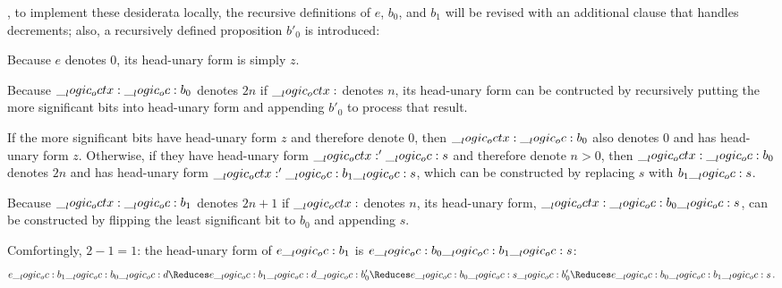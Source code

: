 , to implement these desiderata locally, the recursive definitions of $e$, $b_0$, and $b_1$ will be revised with an additional clause that handles decrements;
also, a recursively defined proposition $b'_0$ is introduced:
% 
\begin{description}[font=\color{structure}]
\item[$e \defd (\dotsb \pmir i) \with (z \pmir d)$]
  Because $e$ denotes $0$, its head-unary form is simply $z$.
\item[$b_0 \defd (\dotsb \pmir i) \with (d \fuse b'_0 \pmir d)$]
  Because $\__logic_octx: \__logic_oc: b_0$ denotes $2n$ if $\__logic_octx:$ denotes $n$, its head-unary form can be contructed by recursively putting the more significant bits into head-unary form and appending $b'_0$ to process that result.
\item[$b'_0 \defd (z \limp z) \with (s \limp b_1 \fuse s)$]
  If the more significant bits have head-unary form $z$ and therefore denote $0$, then $\__logic_octx: \__logic_oc: b_0$ also denotes $0$ and has head-unary form $z$.
  Otherwise, if they have head-unary form $\__logic_octx:' \__logic_oc: s$ and therefore denote $n > 0$, then $\__logic_octx: \__logic_oc: b_0$ denotes $2n$ and has head-unary form $\__logic_octx:' \__logic_oc: b_1 \__logic_oc: s$, which can be constructed by replacing $s$ with $b_1 \__logic_oc: s$.
\item[$b_1 \defd (\dotsb \pmir i) \with (b_0 \fuse s \pmir d)$]
  Because $\__logic_octx: \__logic_oc: b_1$ denotes $2n+1$ if $\__logic_octx:$ denotes $n$, its head-unary form, $\__logic_octx: \__logic_oc: b_0 \__logic_oc: s$, can be constructed by flipping the least significant bit to $b_0$ and appending $s$.
\end{description}
%
Comfortingly, $2-1 = 1$: the head-unary form of $e \__logic_oc: b_1$ is $e \__logic_oc: b_0 \__logic_oc: b_1 \__logic_oc: s$:
\begin{equation*}
  e \oc b_1 \oc b_0 \oc d \Reduces e \oc b_1 \oc d \oc b'_0 \Reduces e \oc b_0 \oc s \oc b'_0 \Reduces e \oc b_0 \oc b_1 \oc s
  \,.
\end{equation*}


